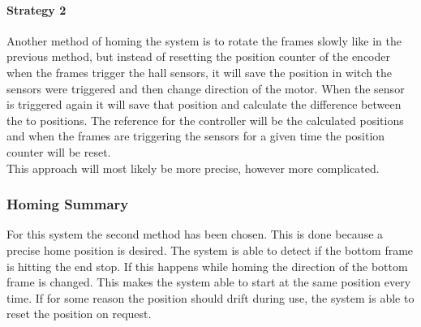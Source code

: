 \documentclass[../../../main]{subfiles}
\begin{document}
\paragraph{Strategy 2}%
\label{par:method_2}
Another method of homing the system is to rotate the frames slowly like in the previous method, but instead of resetting the position counter of the encoder when the frames trigger the hall sensors, it will save the position in witch the sensors were triggered and then change direction of the motor.
When the sensor is triggered again it will save that position and calculate the difference between the to positions.
The reference for the controller will be the calculated positions and when the frames are triggering the sensors for a given time the position counter will be reset.
\\
This approach will most likely be more precise, however more complicated.

\subsubsection{Homing Summary}%
\label{ssub:homing_summary}
For this system the second method has been chosen. This is done because a precise home position is desired.
The system is able to detect if the bottom frame is hitting the end stop. If this happens while homing the direction of the bottom frame is changed. 
This makes the system able to start at the same position every time.
If for some reason the position should drift during use, the system is able to reset the position on request.
\end{document}
